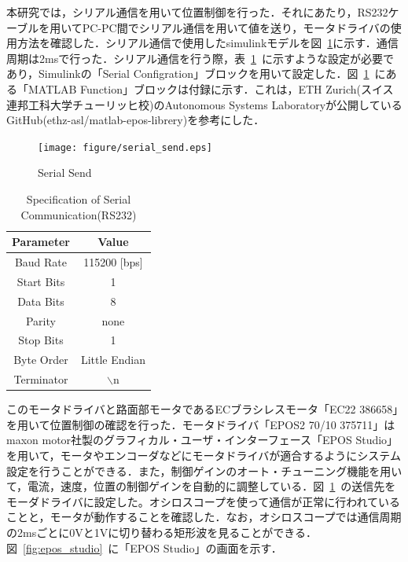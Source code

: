 \documentclass[a4paper,12pt]{article_vdlab_sotsuron}
\begin{document}
\newpage
本研究では，シリアル通信を用いて位置制御を行った．それにあたり，RS232ケーブルを用いてPC-PC間でシリアル通信を用いて値を送り，モータドライバの使用方法を確認した．シリアル通信で使用したsimulinkモデルを図~\ref{fig:serial_send}に示す．通信周期は2msで行った．シリアル通信を行う際，表~\ref{tab:serial}~に示すような設定が必要であり，Simulinkの「Serial Configration」ブロックを用いて設定した．図~\ref{fig:serial_send}~にある「MATLAB Function」ブロックは付録に示す．これは，ETH Zurich(スイス連邦工科大学チューリッヒ校)のAutonomous Systems Laboratoryが公開しているGitHub(ethz-asl/matlab-epos-librery)を参考にした．\cite{eth_zurich}

\vspace*{10mm}
\begin{figure}[htp]
  \begin{center}
    \texttt{[image: figure/serial\_send.eps]}
    \vspace*{3mm}
    \caption{Serial Send}
    \label{fig:serial_send}
  \end{center}
\end{figure}

\begin{table}[htp]
  \begin{center}
    \makeatletter
    \def\@captype{table}
    \makeatother
    \caption{Specification of Serial Communication(RS232)}
      \label{tab:serial}
	\begin{tabular}{cc}\hline
	  Parameter & Value\\\hline
	  Baud Rate & 115200 [bps]\\
	  Start Bits & 1\\
	  Data Bits & 8\\
	  Parity & none\\
	  Stop Bits & 1\\
	  Byte Order & Little Endian\\
	  Terminator & $\backslash$n\\\hline
      \end{tabular}
    \end{center}
\end{table}

\newpage
このモータドライバと路面部モータであるECブラシレスモータ「EC22 386658」を用いて位置制御の確認を行った．モータドライバ「EPOS2 70/10 375711」はmaxon motor社製のグラフィカル・ユーザ・インターフェース「EPOS Studio」を用いて，モータやエンコーダなどにモータドライバが適合するようにシステム設定を行うことができる\cite{epos_studio}．また，制御ゲインのオート・チューニング機能を用いて，電流，速度，位置の制御ゲインを自動的に調整している．図~\ref{fig:serial_send}~の送信先をモーダドライバに設定した。オシロスコープを使って通信が正常に行われていることと，モータが動作することを確認した．なお，オシロスコープでは通信周期の2msごとに0Vと1Vに切り替わる矩形波を見ることができる．図~\ref{fig:epos_studio}~に「EPOS Studio」の画面を示す．
\end{document}
